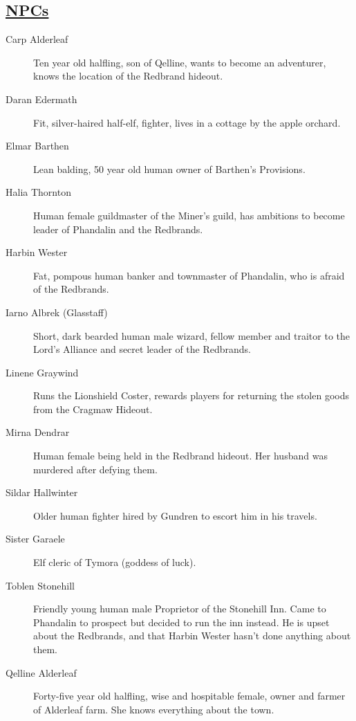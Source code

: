 \subsection{\underline{NPCs}}
\begin{description}
	\item[Carp Alderleaf] Ten year old halfling, son of Qelline, wants to become an adventurer, knows the location of the Redbrand hideout.
	\item[Daran Edermath] Fit, silver-haired half-elf, fighter, lives in a cottage by the apple orchard.
	\item[Elmar Barthen] Lean balding, 50 year old human owner of Barthen's Provisions.
	\item[Halia Thornton] Human female guildmaster of the Miner's guild, has ambitions to become leader of Phandalin and the Redbrands.
	\item[Harbin Wester] Fat, pompous human banker and townmaster of Phandalin, who is afraid of the Redbrands.
	\item[Iarno Albrek (Glasstaff)] Short, dark bearded human male wizard, fellow member and traitor to the Lord's Alliance and secret leader of the Redbrands.
	\item[Linene Graywind] Runs the Lionshield Coster, rewards players for returning the stolen goods from the Cragmaw Hideout.
	\item[Mirna Dendrar] Human female being held in the Redbrand hideout. Her husband was murdered after defying them. 
	\item[Sildar Hallwinter] Older human fighter hired by Gundren to escort him in his travels.
	\item[Sister Garaele] Elf cleric of Tymora (goddess of luck).
	\item[Toblen Stonehill] Friendly young human male Proprietor of the Stonehill Inn. Came to Phandalin to prospect but decided to run the inn instead. He is upset about the Redbrands, and that Harbin Wester hasn't done anything about them.
	\item[Qelline Alderleaf] Forty-five year old halfling, wise and hospitable female, owner and farmer of Alderleaf farm. She knows everything about the town.
\end{description}